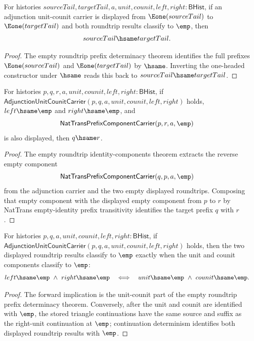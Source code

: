 \begin{theorem}
\label{thm:equivcat-adjunction-empty-roundtrip-e1-prefix-tail-hsame}
For histories
$sourceTail,targetTail,a,unit,counit,left,right:\mathsf{BHist}$, if an
adjunction unit-counit carrier is displayed from $\Eone(sourceTail)$ to
$\Eone(targetTail)$ and both roundtrip results classify to $\emp$, then
$$
sourceTail\hsame targetTail.
$$
\end{theorem}
\begin{proof}
The empty roundtrip prefix determinacy theorem identifies the full prefixes
$\Eone(sourceTail)$ and $\Eone(targetTail)$ by $\hsame$. Inverting the
one-headed constructor under $\hsame$ reads this back to
$sourceTail\hsame targetTail$.
\end{proof}

\begin{theorem}
\label{thm:equivcat-adjunction-empty-roundtrip-target-prefix-deterministic}
For histories $p,q,r,a,unit,counit,left,right:\mathsf{BHist}$, if
$\mathsf{AdjunctionUnitCounitCarrier}(p,q,a,unit,counit,left,right)$ holds,
$left\hsame\emp$ and $right\hsame\emp$, and
$$
\mathsf{NatTransPrefixComponentCarrier}(p,r,a,\emp)
$$
is also displayed, then $q\hsame r$.
\end{theorem}
\begin{proof}
The empty roundtrip identity-components theorem extracts the reverse empty
component
$$
\mathsf{NatTransPrefixComponentCarrier}(q,p,a,\emp)
$$
from the adjunction carrier and the two empty displayed roundtrips. Composing
that empty component with the displayed empty component from $p$ to $r$ by
NatTrans empty-identity prefix transitivity identifies the target prefix
$q$ with $r$.
\end{proof}

\begin{theorem}
\label{thm:equivcat-adjunction-empty-roundtrip-unit-counit-empty-iff}
For histories $p,q,a,unit,counit,left,right:\mathsf{BHist}$, if
$\mathsf{AdjunctionUnitCounitCarrier}(p,q,a,unit,counit,left,right)$ holds,
then the two displayed roundtrip results classify to $\emp$ exactly when the
unit and counit components classify to $\emp$:
$$
left\hsame\emp\ \wedge\ right\hsame\emp
\quad\Longleftrightarrow\quad
unit\hsame\emp\ \wedge\ counit\hsame\emp.
$$
\end{theorem}
\begin{proof}
The forward implication is the unit-counit part of the empty roundtrip prefix
determinacy theorem. Conversely, after the unit and counit are identified with
$\emp$, the stored triangle continuations have the same source and suffix as
the right-unit continuation at $\emp$; continuation determinism identifies
both displayed roundtrip results with $\emp$.
\end{proof}

